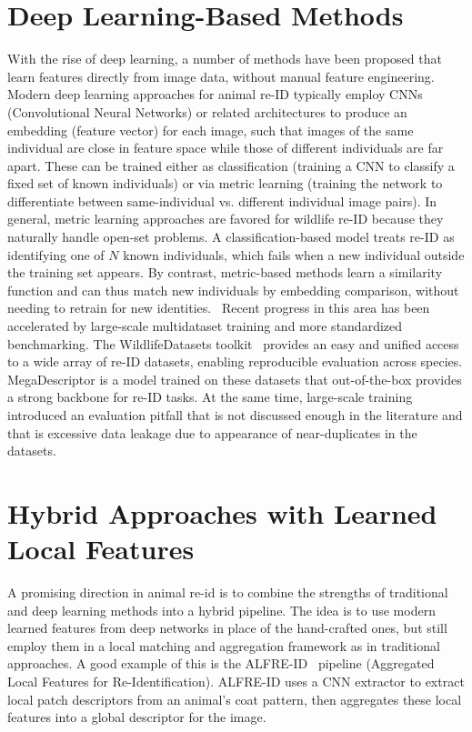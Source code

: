 \section{Deep Learning-Based Methods}
With the rise of deep learning, a number of methods have been proposed that learn features directly from image data, without manual feature engineering. Modern deep learning approaches for animal re-ID typically employ CNNs (Convolutional Neural Networks) or related architectures to produce an embedding (feature vector) for each image, such that images of the same individual are close in feature space while those of different individuals are far apart. These can be trained either as classification (training a CNN to classify a fixed set of known individuals) or via metric learning (training the network to differentiate between same-individual vs. different individual image pairs). In general, metric learning approaches are favored for wildlife re-ID because they naturally handle open-set problems. A classification-based model treats re-ID as identifying one of $N$ known individuals, which fails when a new individual outside the training set appears. By contrast, metric-based methods learn a similarity function and can thus match new individuals by embedding comparison, without needing to retrain for new identities.~\cite{springerSpeciesAgnosticPatterned} Recent progress in this area has been accelerated by large-scale multidataset training and more standardized benchmarking. The WildlifeDatasets toolkit~\cite{čermák2023wildlifedatasetsopensourcetoolkitanimal} provides an easy and unified access to a wide array of re-ID datasets, enabling reproducible evaluation across species. MegaDescriptor is a model trained on these datasets that out-of-the-box provides a strong backbone for re-ID tasks. At the same time, large-scale training introduced an evaluation pitfall that is not discussed enough in the literature and that is excessive data leakage due to appearance of near-duplicates in the datasets. 

\section{Hybrid Approaches with Learned Local Features}
A promising direction in animal re-id is to combine the strengths of traditional and deep learning methods into a hybrid pipeline. The idea is to use modern learned features from deep networks in place of the hand-crafted ones, but still employ them in a local matching and aggregation framework as in traditional approaches. A good example of this is the ALFRE-ID~\cite{springerSpeciesAgnosticPatterned} pipeline (Aggregated Local Features for Re-Identification). ALFRE-ID uses a CNN extractor to extract local patch descriptors from an animal's coat pattern, then aggregates these local features into a global descriptor for the image. 

